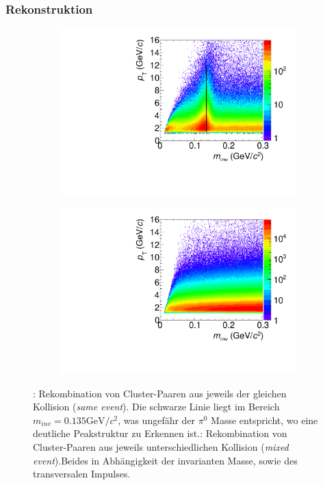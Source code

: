 \documentclass[]{article}
\begin{document}
	
	\subsubsection{Rekonstruktion}
	\begin{figure}[tbp]
		\centering
		\begin{subfigure}{.5\textwidth}
			\centering
			\includegraphics[width=.95\linewidth]{hInvMass_pT_Signal.pdf}
			\caption{}
			\label{figInvMassPt_a}
		\end{subfigure}%
		\begin{subfigure}{.5\textwidth}
			\centering
			\includegraphics[width=.95\linewidth]{hInvMass_pT_Bkg.pdf}
			\caption{}
			\label{figInvMassPt_b}
		\end{subfigure}
		\caption{: Rekombination von Cluster-Paaren aus jeweils der gleichen Kollision ({\it same event}). Die schwarze Linie liegt im Bereich $m_{inv}=0.135\text{GeV/}c^{2}$, was ungef{\"a}hr der $\pi^{0}$ Masse entspricht, wo eine deutliche Peakstruktur zu Erkennen ist.: Rekombination von Cluster-Paaren aus jeweils unterschiedlichen Kollision ({\it mixed event}).\newline Beides in Abh{\"a}ngigkeit der invarianten Masse, sowie des transversalen Impulses.}
		\label{figInvMassPt}
	\end{figure}
\end{document}
